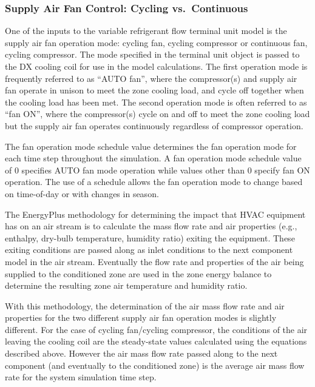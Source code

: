 \subsubsection{Supply Air Fan Control: Cycling vs.~Continuous}\label{supply-air-fan-control-cycling-vs.continuous-2}

One of the inputs to the variable refrigerant flow terminal unit model is the supply air fan operation mode: cycling fan, cycling compressor or continuous fan, cycling compressor. The mode specified in the terminal unit object is passed to the DX cooling coil for use in the model calculations. The first operation mode is frequently referred to as ``AUTO fan'', where the compressor(s) and supply air fan operate in unison to meet the zone cooling load, and cycle off together when the cooling load has been met. The second operation mode is often referred to as ``fan ON'', where the compressor(s) cycle on and off to meet the zone cooling load but the supply air fan operates continuously regardless of compressor operation.

The fan operation mode schedule value determines the fan operation mode for each time step throughout the simulation. A fan operation mode schedule value of 0 specifies AUTO fan mode operation while values other than 0 specify fan ON operation. The use of a schedule allows the fan operation mode to change based on time-of-day or with changes in season.

The EnergyPlus methodology for determining the impact that HVAC equipment has on an air stream is to calculate the mass flow rate and air properties (e.g., enthalpy, dry-bulb temperature, humidity ratio) exiting the equipment. These exiting conditions are passed along as inlet conditions to the next component model in the air stream. Eventually the flow rate and properties of the air being supplied to the conditioned zone are used in the zone energy balance to determine the resulting zone air temperature and humidity ratio.

With this methodology, the determination of the air mass flow rate and air properties for the two different supply air fan operation modes is slightly different. For the case of cycling fan/cycling compressor, the conditions of the air leaving the cooling coil are the steady-state values calculated using the equations described above. However the air mass flow rate passed along to the next component (and eventually to the conditioned zone) is the average air mass flow rate for the system simulation time step.

